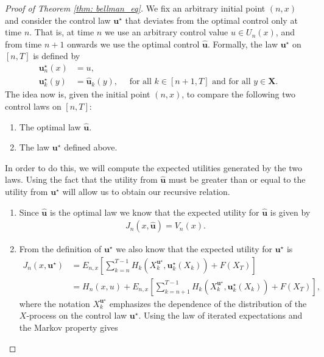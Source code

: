 \documentclass[\topdir/lecture\_notes.tex]{subfiles}
\begin{document}
\begin{optional}
\begin{proof}[Proof of Theorem \ref{thm: bellman_eq}]
We fix an arbitrary initial point $(n, x)$ and consider the control law $\mathbf{u}^{\star}$ that deviates from the optimal control only at time $n$. That is, at time $n$ we use an arbitrary control value $u \in U_{n}(x)$, and from time $n+1$ onwards we use the optimal control $\hat{\mathbf{u}}$. Formally, the law $\mathbf{u}^{\star}$ on $[n, T]$ is defined by
\begin{align*}
\mathbf{u}_{n}^{\star}(x)&=u, \\
\mathbf{u}_{k}^{\star}(y)&=\hat{\mathbf{u}}_{k}(y), \quad \text { for all } k \in[n+1, T] \text { and for all } y \in \mathbf{X}.
\end{align*}
The idea now is, given the initial point $(n, x)$, to compare the following two control laws on $[n, T]$:
\begin{enumerate}
  \item The optimal law $\hat{\mathbf{u}}$.
  \item The law $\mathbf{u}^{\star}$ defined above.
\end{enumerate}
In order to do this, we will compute the expected utilities generated by the two laws. Using the fact that the utility from $\hat{\mathbf{u}}$ must be greater than or equal to the utility from $\mathbf{u}^{\star}$ will allow us to obtain our recursive relation.
\begin{enumerate}
  \item Since $\hat{\mathbf{u}}$ is the optimal law we know that the expected utility for $\hat{\mathbf{u}}$ is given by
    \begin{align*}
    J_{n}(x, \hat{\mathbf{u}})=V_{n}(x).
    \end{align*}
  \item From the definition of $\mathbf{u}^{\star}$ we also know that the expected utility for $\mathbf{u}^{\star}$ is
    \begin{align*}
    J_{n}(x, \mathbf{u}^{\star}) & =E_{n, x}\left[\sum_{k=n}^{T-1} H_{k}(X_{k}^{\mathbf{u}^{\star}}, \mathbf{u}_{k}^{\star}(X_{k}))+F(X_{T})\right] \\
    & =H_{n}(x, u)+E_{n, x}\left[\sum_{k=n+1}^{T-1} H_{k}(X_{k}^{\mathbf{u}^{\star}}, \mathbf{u}_{k}^{\star}(X_{k}))+F(X_{T})\right],
    \end{align*}
    where the notation $X_{k}^{\mathbf{u}^{\star}}$ emphasizes the dependence of the distribution of the $X$-process on the control law $\mathbf{u}^{\star}$. Using the law of iterated expectations and the Markov property gives

\end{enumerate}
\end{proof}
\end{optional}
\end{document}
